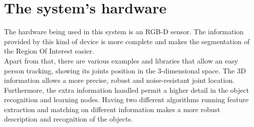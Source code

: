\section{The system's hardware}

The hardware being used in this system is an RGB-D sensor. The information provided by this kind of device is more complete and makes the segmentation of the Region Of Interest easier. 
\\

Apart from that, there are various examples and libraries that allow an easy person tracking, showing its joints position in the 3-dimensional space. The 3D information allows a more precise, robust and noise-resistant joint location.
\\

Furthermore, the extra information handled permit a higher detail in the object recognition and learning nodes. Having two different algorithms running feature extraction and matching on different information makes a more robust description and recognition of the objects. 

